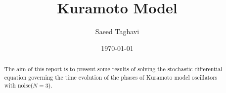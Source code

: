 \documentclass{article}
\title{Kuramoto Model}
\author{Saeed Taghavi}
\date{\today}
\begin{document}
 \maketitle

 \begin{abstract}
     The aim of this report is to present some results of solving the stochastic differential equation governing the time evolution of the phases of Kuramoto model oscillators with noise($N=3$).
 
 \end{abstract}

%
 
 
%
%

 
\end{document}
